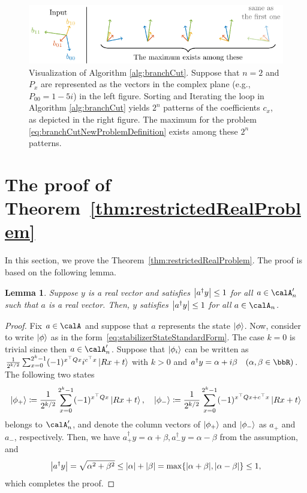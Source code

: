 \documentclass[a4paper, onecolumn, 11pt, longbibliography]{quantumarticle}
\newcommand{\defeq}{\coloneqq}
\newtheorem{lemma}{Lemma}
\begin{document}
\begin{figure}[htbp]
  \centering
  \includegraphics[width=\columnwidth]{imgs/argsort.pdf}
  \caption{
    Visualization of Algorithm \ref{alg:branchCut}.
    Suppose that $n=2$ and $P_x$ are represented as the vectors in the complex plane
    (e.g., $P_{00} = 1-5i$) in the left figure.
    Sorting and Iterating the loop in Algorithm \ref{alg:branchCut}
    yields $2^n$ patterns of the coefficients $c_x$,
    as depicted in the right figure.
    The maximum for the problem \eqref{eq:branchCutNewProblemDefinition}
    exists among these $2^n$ patterns.
  }
  \label{fig:argsort}
\end{figure}

\section{The proof of Theorem~\ref{thm:restrictedRealProblem}}

In this section, we prove the Theorem~\ref{thm:restrictedRealProblem}.
The proof is based on the following lemma.
\begin{lemma}{\label{lem:absRealForTIsAbsRealForS}}
  Suppose $y$ is a real vector and satisfies
  $\abs{a^\dagger y} \leq 1$ for all $a \in \calA'_n$
  such that $a$ is a real vector.
  Then, $y$ satisfies
  $\abs{a^\dagger y} \leq 1$ for all $a \in \calA_n$.
\end{lemma}
\begin{proof}
  Fix $a \in \calA$ and suppose that $a$ represents
  the state $\ket{\phi}$.
  Now, consider to write $\ket{\phi}$ as in the form~\eqref{eq:stabilizerStateStandardForm}.
  The case $k=0$ is trivial since then $a \in \calA'_n$.
  Suppose that $\ket{\phi_i}$ can be written as
  $\frac{1}{2^{k/2}}\sum_{x=0}^{2^k-1} (-1)^{x^\top Q x} i^{c^\top x} \ket{Rx+t}$ with $k>0$
  and
  $a^\dagger y = \alpha + i\beta \quad (\alpha, \beta \in \bbR)$.
  The following two states
  \begin{equation*}
    \ket{\phi_+} \defeq \frac{1}{2^{k/2}}\sum_{x=0}^{2^k-1} (-1)^{x^\top Q x} \ket{Rx+t}, \quad
    \ket{\phi_-} \defeq \frac{1}{2^{k/2}}\sum_{x=0}^{2^k-1} (-1)^{x^\top Q x + c^\top x} \ket{Rx+t}
  \end{equation*}
  belongs to $\calA'_n$,
  and denote the column vectors of $\ket{\phi_+}$ and $\ket{\phi_-}$ as $a_+$ and $a_-$, respectively.
  Then, we have $a_+^\dagger y = \alpha+\beta, a_-^\dagger y = \alpha-\beta$
  from the assumption, and
  \begin{equation*}
    \abs{a^\dagger y}
    =\sqrt{\alpha^2 + \beta^2}
    \leq \abs{\alpha}+\abs{\beta}
    = \max\{\abs{\alpha+\beta}, \abs{\alpha-\beta}\}
    \leq 1,
  \end{equation*}
  which completes the proof.
\end{proof}
\end{document}
